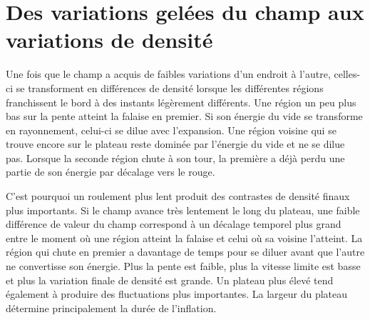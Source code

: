 \begin{classroomqa}
\end{classroomqa}

\begin{classroomqa}
\end{classroomqa}

\section{Des variations gelées du champ aux variations de densité}

Une fois que le champ a acquis de faibles variations d’un endroit à l’autre, celles-ci se transforment en différences de densité lorsque les différentes régions franchissent le bord à des instants légèrement différents. Une région un peu plus bas sur la pente atteint la falaise en premier. Si son énergie du vide se transforme en rayonnement, celui-ci se dilue avec l’expansion. Une région voisine qui se trouve encore sur le plateau reste dominée par l’énergie du vide et ne se dilue pas. Lorsque la seconde région chute à son tour, la première a déjà perdu une partie de son énergie par décalage vers le rouge.

C’est pourquoi un roulement plus lent produit des contrastes de densité finaux plus importants. Si le champ avance très lentement le long du plateau, une faible différence de valeur du champ correspond à un décalage temporel plus grand entre le moment où une région atteint la falaise et celui où sa voisine l’atteint. La région qui chute en premier a davantage de temps pour se diluer avant que l’autre ne convertisse son énergie. Plus la pente est faible, plus la vitesse limite est basse et plus la variation finale de densité est grande. Un plateau plus élevé tend également à produire des fluctuations plus importantes. La largeur du plateau détermine principalement la durée de l’inflation.

